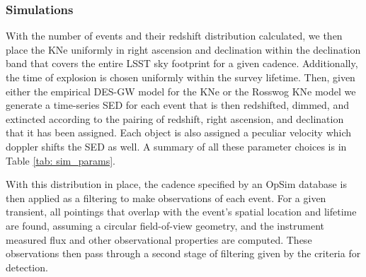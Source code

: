 \subsubsection{Simulations}
With the number of events and their redshift distribution calculated, we then place the KNe uniformly in right ascension and declination within the declination band that covers the entire LSST sky footprint for a given cadence. Additionally, the time of explosion is chosen uniformly within the survey lifetime. Then, given either the empirical DES-GW model for the KNe or the Rosswog KNe model we generate a time-series SED for each event that is then redshifted, dimmed, and extincted according to the pairing of redshift, right ascension, and declination that it has been assigned. Each object is also assigned a peculiar velocity which doppler shifts the SED as well. A summary of all these parameter choices is in Table \ref{tab: sim_params}.\par

\begin{table}[h!]
\centering
{}
 \caption{The space of parameters that describe the population of KNe in the Rosswog semianalytic model.}\label{tab: sim_params}
\end{table}

With this distribution in place, the cadence specified by an OpSim database is then applied as a filtering to make observations of each event. For a given transient, all pointings that overlap with the event's spatial location and lifetime are found, assuming a circular field-of-view geometry, and the instrument measured flux and other observational properties are computed. These observations then pass through a second stage of filtering given by the criteria for detection.\par

